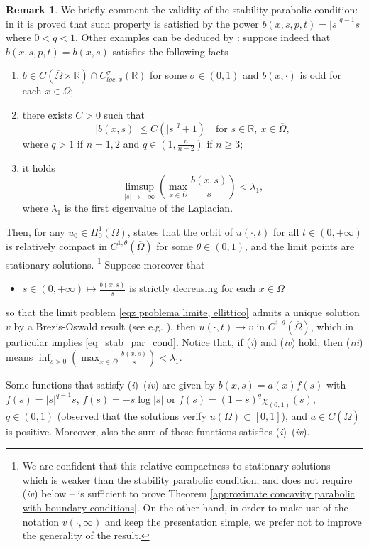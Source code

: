 \documentclass[11pt, reqno]{amsart}
\theoremstyle{definition}
\newtheorem{remark}[lemma]{Remark}
\numberwithin{equation}{section}
\newcommand{\Omegabar}{\overline{\Omega}}
\newcommand{\R}{\mathbb{R}}
\begin{document}
\begin{remark}\label{stability parabolic condition u^gamma}
	We briefly comment the validity of the stability parabolic condition: 
	in \cite[Theorem 1.1]{AkagiKajikiya2015} it is proved that such property is satisfied by the power $b(x,s,p,t)=|s|^{q-1}s$
	where $0<q<1$.	
	Other examples can be deduced by \cite{Kajikiya2018}: suppose indeed that $b(x,s,p,t)=b(x,s)$ satisfies the following facts
	\begin{enumerate}[label=\textit{\roman*})]
		\item $b \in C(\Omegabar\times \R) \cap C_{loc, x}^{\sigma}(\R)$ for some $\sigma\in (0,1)$ and $b(x, \cdot)$ is odd for each $x \in \Omega$;
		\item there exists $C>0$ such that \[ |b(x,s)|\leq C(|s|^q+1)\quad \text{for }s\in\R, \ x\in \Omegabar ,\]
		where $q>1$ if $n=1,2$ and $q\in (1,\frac{n}{n-2})$ if $n\geq 3$;
		\item it holds \[ \limsup_{|s|\to +\infty} \left(\max_{x\in \Omegabar}\frac{b(x,s)}{s}\right) <\lambda_1,\]
		where $\lambda_1$ is the first eigenvalue of the Laplacian.
	\end{enumerate} 
	Then, for any $u_0 \in H^1_0(\Omega)$, \cite[Theorem 2.1]{Kajikiya2018} states that the orbit of $u(\cdot,t)$ for all $t\in(0,+\infty)$ is relatively compact in $C^{1,\theta}(\Omegabar)$ for some $\theta\in (0,1)$, and the limit points are stationary solutions.%
\footnote{We are confident that this relative compactness to stationary solutions -- which is weaker than the stability parabolic condition, and does not require (\textit{iv}) below -- is sufficient to prove Theorem \ref{approximate concavity parabolic with boundary conditions}. On the other hand, in order to make use of the notation $v(\cdot, \infty)$ and keep the presentation simple, we prefer not to improve the generality of the result.}
	Suppose moreover that 
	\begin{itemize}
	\item[$iv)$] $s\in(0,+\infty) \mapsto \frac{b(x, s)}{s}$ is strictly decreasing for each $x \in \Omega$ 
	\end{itemize}
	so that the limit problem \eqref{eqz problema limite, ellittico} admits a unique solution $v$ by a Brezis-Oswald result (see e.g. \cite[Lemma A.1]{GaSq24}), then $u(\cdot,t) \to v $ in $C^{1,\theta}(\Omegabar)$, which in particular implies \eqref{eq_stab_par_cond}. 
	Notice that, if (\textit{i}) and (\textit{iv}) hold, then (\textit{iii}) means $\inf_{s>0} \left(\max_{x\in \Omegabar}\frac{b(x,s)}{s}\right) <\lambda_1$.
	
	Some functions that satisfy (\textit{i})--(\textit{iv}) are given by $b(x,s)=a(x) f(s)$ with $f(s)=|s|^{q-1}s$, $f(s)=-s\log |s|$ or
	 $f(s)=(1-s)^q \chi_{(0,1)}(s)$, $q \in (0,1)$ (observed that the solutions verify $u(\Omega) \subset [0,1]$), 
	and $a \in C(\Omegabar)$ is positive.
	Moreover, also the sum of these functions satisfies (\textit{i})--(\textit{iv}). 
\end{remark}
\end{document}
